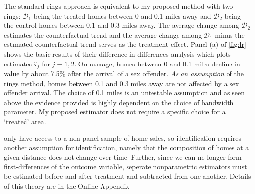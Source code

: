 \documentclass[12pt]{article}
\begin{document}
The standard rings approach is equivalent to my proposed method with two rings: $\mathcal{D}_1$ being the treated homes between 0 and 0.1 miles away and $\mathcal{D}_2$ being the control homes between 0.1 and 0.3 miles away. The average change among $\mathcal{D}_2$ estimates the counterfactual trend and the average change among $\mathcal{D}_1$ minus the estimated counterfactual trend serves as the treatment effect. Panel (a) of \autoref{fig:lr} shows the basic results of their difference-in-differences analysis which plots estimates $\hat{\tau}_j$ for $j = 1,2$.  On average, homes between 0 and 0.1 miles decline in value by about 7.5\% after the arrival of a sex offender. \emph{As an assumption} of the rings method, homes between 0.1 and 0.3 miles away are not affected by a sex offender arrival. The choice of 0.1 miles is an untestable assumption and as seen above the evidence provided is highly dependent on the choice of bandwidth parameter. My proposed estimator does not require a specific choice for a `treated' area.

\citet{Linden_Rockoff_2008} only have access to a non-panel sample of home sales, so identification requires another assumption for identification, namely that the composition of homes at a given distance does not change over time. Further, since we can no longer form first-differences of the outcome variable, seperate nonparametric estimators must be estimated before and after treatment and subtracted from one another. Details of this theory are in the Online Appendix
\end{document}
